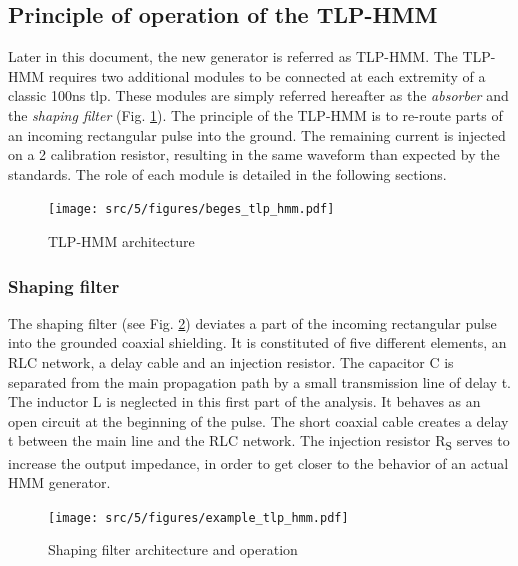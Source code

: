 \subsection{Principle of operation of the TLP-HMM}

Later in this document, the new generator is referred as TLP-HMM.
The TLP-HMM requires two additional modules to be connected at each extremity of a classic 100ns \gls{tlp}.
These modules are simply referred hereafter as the \textit{absorber} and the \textit{shaping filter} (Fig. \ref{fig:tlp_hmm_architecture}).
The principle of the TLP-HMM is to re-route parts of an incoming rectangular pulse into the ground.
The remaining current is injected on a 2\textOmega{} calibration resistor, resulting in the same waveform than expected by the standards.
The role of each module is detailed in the following sections.

\begin{figure}[!h]
  \centering
  \texttt{[image: src/5/figures/beges\_tlp\_hmm.pdf]}
  \caption{TLP-HMM architecture}
  \label{fig:tlp_hmm_architecture}
\end{figure}

\subsubsection{Shaping filter}

The shaping filter (see Fig. \ref{fig:shaping_filter_example}) deviates a part of the incoming rectangular pulse into the grounded coaxial shielding.
It is constituted of five different elements, an RLC network, a delay cable and an injection resistor.
The capacitor C is separated from the main propagation path by a small transmission line of delay \textDelta{}t.
The inductor L is neglected in this first part of the analysis.
It behaves as an open circuit at the beginning of the pulse.
The short coaxial cable creates a delay \textDelta{}t between the main line and the RLC network.
The injection resistor R\textsubscript{S} serves to increase the output impedance, in order to get closer to the behavior of an actual HMM generator.

\begin{figure}[!h]
  \centering
  \texttt{[image: src/5/figures/example\_tlp\_hmm.pdf]}
  \caption{Shaping filter architecture and operation}
  \label{fig:shaping_filter_example}
\end{figure}


